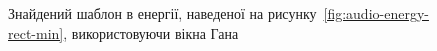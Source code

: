 \begin{figure}[h]

                \caption{Знайдений шаблон в енергії, наведеної на рисунку~\ref{fig:audio-energy-rect-min},
                    використовуючи вікна Гана}
                \label{fig:matched-energy-rect-min-hann}
            \end{figure}

